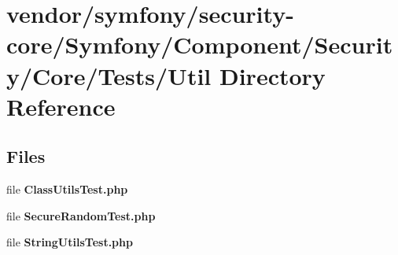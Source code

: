 \section{vendor/symfony/security-\/core/\+Symfony/\+Component/\+Security/\+Core/\+Tests/\+Util Directory Reference}
\label{dir_7cdb3e0fda9e066189bff3d209c06fcd}
\subsection*{Files}
\begin{DoxyCompactItemize}
\item 
file {\bf Class\+Utils\+Test.\+php}
\item 
file {\bf Secure\+Random\+Test.\+php}
\item 
file {\bf String\+Utils\+Test.\+php}
\end{DoxyCompactItemize}
